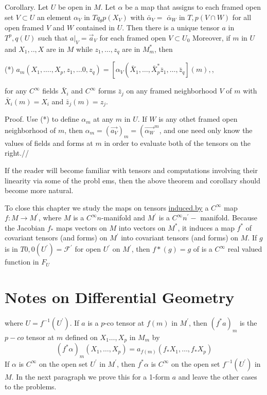 \documentclass[10pt]{article}
\begin{document}
Corollary. Let $U$ be open in $M$. Let $\alpha$ be a map that assigns to each framed open set $V \subset U$ an element $\alpha_{V}$ in $T q_{\theta} p\left(X_{V}\right)$ with $\bar{\alpha}_{V}=$ $\bar{\alpha}_{W}$ in $T, p(V \cap W)$ for all open framed $V$ and $W$ contained in $U$. Then there is a unique tensor $a$ in $T^{p}, q(U)$ such that $\left.a\right|_{V}=\vec{a}_{V}$ for each framed open $V \subset U_{0}$ Moreover, if $m$ in $U$ and $X_{1}, . ., X$ are in $M$ while $z_{1}, \ldots, z_{q}$ are in $M_{m}^{*}$, then

(*) $a_{m}\left(X_{1}, \ldots ., X_{p}, z_{1}, \ldots 0, z_{q}\right)=\left[\alpha_{V}\left(\bar{X}_{1}, \ldots, \bar{X}_{p}^{*} \bar{z}_{1}, \ldots, \bar{z}_{q}\right](m),\right.$,

for any $C^{\infty}$ fields $\bar{X}_{i}$ and $C^{\infty}$ forms $\bar{z}_{j}$ on any framed neighborhood $V$ of $m$ with $\bar{X}_{i}(m)=X_{i}$ and $\bar{z}_{j}(m)=z_{j}$.

Proof. Use (*) to define $\alpha_{m}$ at any $m$ in $U$. If $W$ is any othet framed open neighborhood of $m$, then $\alpha_{m}=\left(\overrightarrow{a_{V}}\right)_{m}=\left({\overrightarrow{\alpha_{W}}}^{m}\right.$, and one need only know the values of fields and forms at $m$ in order to evaluate both of the tensors on the right.//

If the reader will become familiar with tensors and computations involving their linearity via some of the probl ems, then the above theorem and corollary should become more natural.

To close this chapter we study the maps on tensors \href{http://induced.by}{induced.by} a $C^{\infty}$ map $f: M \rightarrow M^{\prime}$, where $M$ is a $C^{\infty} n$-manifold and $M^{\prime}$ is a $C^{\infty} n^{\prime}-$ manifold. Because the Jacobian $f_{*}$ maps vectors on $M$ into vectors on $M^{*}$, it induces a map $f^{*}$ of covariant tensors (and forms) on $M^{\prime}$ into covariant tensors (and forms) on $M$. If $g$ is in $T 0,0\left(U^{\prime}\right)=\mathscr{F}^{\prime}$ for open $U^{\prime}$ on $M^{\prime}$, then $f *(g)=g$ of is a $C^{\infty}$ real valued function in $F_{U}$

\section{Notes on Differential Geometry}
where $U=f^{-1}\left(U^{\prime}\right)$. If $a$ is a $p$-co tensor at $f(m)$ in $M^{\prime}$, then $\left(f^{*} a\right)_{m}$ is the $p-c o$ tensor at $m$ defined on $X_{1} \ldots, X_{p}$ in $M_{m}$ by
$$
\left(f^{*} \alpha\right)_{m}\left(X_{1}, \ldots, X_{p}\right)=a_{f(m)}\left(f_{*} X_{1}, \ldots, f_{*} X_{p}\right)
$$
If $\alpha$ is $C^{\infty}$ on the open set $U^{\prime}$ in $M^{\prime}$, then $f^{*} \alpha$ is $C^{\infty}$ on the open set $f^{-1}\left(U^{\prime}\right)$ in $M$. In the next paragraph we prove this for a 1-form $a$ and leave the other cases to the problems.
\end{document}
